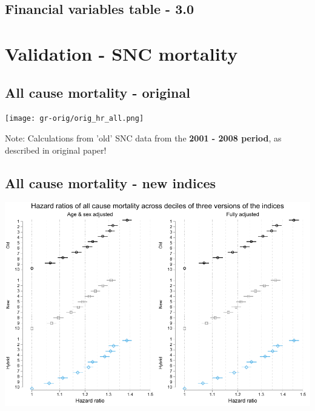 \documentclass[a4paper, notitlepage, fleqn]{article} %
\begin{document}
\subsection{Financial variables table - 3.0}
\begin{stlog}\end{stlog}
\newpage
\begin{stlog}\end{stlog}
\newpage
\begin{stlog}\end{stlog}
\newpage
\section{Validation - SNC mortality}

\subsection{All cause mortality - original}

\begin{center}
\texttt{[image: gr-orig/orig\_hr\_all.png]} 
\end{center}

Note: 	Calculations from 'old' SNC data from the \textbf{2001 - 2008 period}, as described in original paper!

\subsection{All cause mortality - new indices}
\begin{center}
\includegraphics[width=\textwidth]{gr/sep3.pdf}
\end{center}
\end{document}
